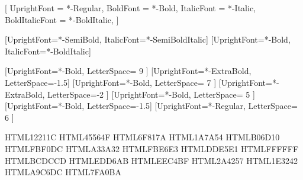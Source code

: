 %
%
%

\usepackage{fontspec}

\setsansfont{Inter}[
    UprightFont     = *-Regular,
    BoldFont        = *-Bold,
    ItalicFont      = *-Italic,
    BoldItalicFont  = *-BoldItalic,
]
\renewcommand{\familydefault}{\sfdefault}

\newfontfamily{}[UprightFont=*-SemiBold, ItalicFont=*-SemiBoldItalic]
\newfontfamily{}[UprightFont=*-Bold,     ItalicFont=*-BoldItalic]

\newfontfamily{}[UprightFont=*-Bold,      LetterSpace= 9  ]  %
\newfontfamily{}[UprightFont=*-ExtraBold, LetterSpace=-1.5]  %
\newfontfamily{}[UprightFont=*-Bold,      LetterSpace= 7  ]  %
\newfontfamily{}[UprightFont=*-ExtraBold, LetterSpace=-2  ]  %
\newfontfamily{}[UprightFont=*-Bold,      LetterSpace= 5  ]  %
\newfontfamily{}[UprightFont=*-Bold,      LetterSpace=-1.5]  %
\newfontfamily{}[UprightFont=*-Regular,   LetterSpace= 6  ]  %

\usepackage{xcolor}
\usepackage{qrcode}

\definecolor{ink}       {HTML}{12211C}
\definecolor{inksoft}   {HTML}{45564F}
\definecolor{inkfaint}  {HTML}{6F817A}
\definecolor{accent}    {HTML}{1A7A54}
\definecolor{amber}     {HTML}{B06D10}
\definecolor{ambersoft} {HTML}{FBF0DC}
\definecolor{red}       {HTML}{A33A32}
\definecolor{redsoft}   {HTML}{FBE6E3}
\definecolor{line}      {HTML}{DDE5E1}
\definecolor{paper}     {HTML}{FFFFFF}
\definecolor{goodedge}  {HTML}{BCDCCD}
\definecolor{warnedge}  {HTML}{EDD6AB}
\definecolor{bededge}   {HTML}{EEC4BF}
\definecolor{navy}      {HTML}{2A4257}
\definecolor{navydeep}  {HTML}{1E3242}
\definecolor{byline}    {HTML}{A9C6DC}
\definecolor{affil}     {HTML}{7FA0BA}

